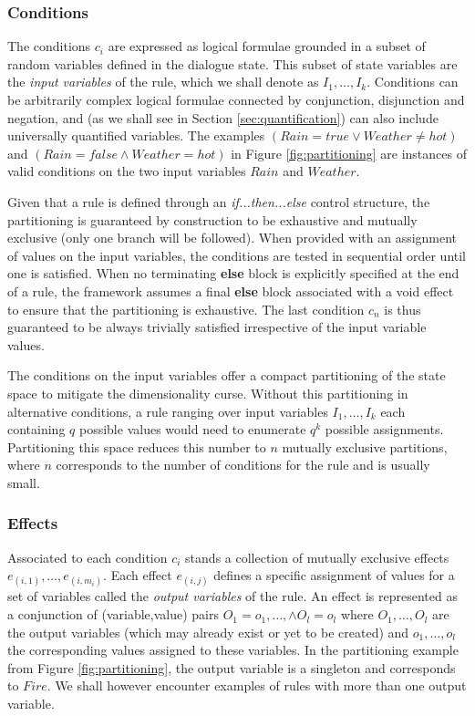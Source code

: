 \subsubsection*{Conditions}

The conditions $c_i$ are expressed as logical formulae grounded in a subset of random variables defined in the dialogue state. This subset of state variables are the \textit{input variables} of the rule, which we shall denote as $I_1, \dots, I_{k}$. Conditions can be arbitrarily complex logical formulae connected by conjunction, disjunction and negation, and (as we shall see in Section \ref{sec:quantification}) can also include universally quantified variables. The examples $(\mathit{Rain}\!=\mathit{true} \lor \mathit{Weather}\!\neq\mathit{hot})$ and $(\mathit{Rain}\!=\mathit{false} \land \mathit{Weather}\!=\mathit{hot})$ in Figure \ref{fig:partitioning} are instances of valid conditions on the two input variables $Rain$ and $\mathit{Weather}$. 

Given that a rule is defined through an \textit{if...then...else} control structure, the partitioning is guaranteed by construction to be exhaustive and mutually exclusive (only one branch will be followed).  When provided with an assignment of values on the input variables, the conditions are tested in sequential order until one is satisfied. When no terminating \textbf{else} block is explicitly specified at the end of a rule, the framework assumes a final \textbf{else} block associated with a void effect to ensure that the partitioning is exhaustive. The last condition $c_n$ is thus guaranteed to be always trivially satisfied irrespective of the input variable values. 

The conditions on the input variables offer a compact partitioning of the state space to mitigate the dimensionality curse.  Without this partitioning in alternative conditions, a rule ranging over input variables $I_1, \dots, I_{k}$ each containing $q$ possible values would need to enumerate $q^{k}$ possible assignments.  Partitioning this space reduces this number to $n$ mutually exclusive partitions, where $n$ corresponds to the number of conditions for the rule and is usually small. 


\subsubsection*{Effects}

Associated to each condition $c_i$ stands a collection of mutually exclusive effects $e_{(i,1)}, \dots, e_{(i,m_i)}$. Each effect $e_{(i,j)}$ defines a specific assignment of values for a set of variables called the \textit{output variables} of the rule.  An effect is represented as a conjunction of (variable,value) pairs $O_1\!=\!o_1, \dots, \land O_{l}\!=\!o_{l}$ where $O_1, \dots, O_{l}$ are the output variables (which may already exist or yet to be created) and $o_1, \dots, o_{l}$ the corresponding values assigned to these variables. In the partitioning example from Figure \ref{fig:partitioning}, the output variable is a singleton and corresponds to $Fire$. We shall however encounter examples of rules with more than one output variable. 

